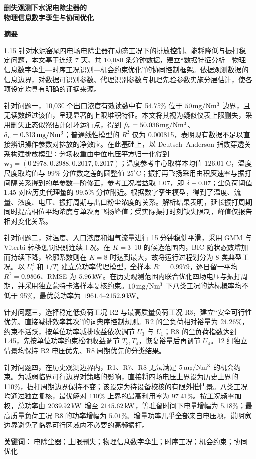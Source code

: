 \thispagestyle{plain}
\begin{center}
  \vspace*{-1.2em}
  {\heiti\bfseries 删失观测下水泥电除尘器的\\[0.20em]
  物理信息数字孪生与协同优化\par}
  \vspace{0.9em}
  {\heiti\bfseries 摘\quad 要}
\end{center}

\begin{spacing}{1.15}
针对水泥窑尾四电场电除尘器在动态工况下的排放控制、能耗降低与振打稳定问题，本文基于连续 7 天、共 10,080 条分钟数据，建立“数据特征分析—物理信息数字孪生—时序工况识别—机会约束优化”的协同控制框架。依据观测数据的信息边界，对数据可识别参数、代理识别参数与机理先验参数实施分层估计，使各项设定均具有明确的证据来源。

针对问题一，10,030 个出口浓度有效读数中有 54.75\% 位于 $50\,\mathrm{mg/Nm^3}$ 边界，且无读数超过该值，呈现显著的上限堆积特征。本文将其视为疑似仪表上限删失，采用删失正态似然估计闭环运行点，得到 $\hat\mu_c=50.036\,\mathrm{mg/Nm^3}$、$\hat\sigma_c=0.313\,\mathrm{mg/Nm^3}$；普通线性模型的 $R^2$ 仅为 0.000815，表明现有数据不足以直接辨识操作参数对排放的净效应。在此基础上，以 Deutsch--Anderson 指数穿透关系构建排放模型：分场权重由中位电压平方归一化得到 $\bm w_0=(0.2978,0.2988,0.2017,0.2017)$；温度参考中心取样本均值 $126.01^\circ\mathrm C$，温度尺度取均值与 99\% 分位数之差的圆整值 $25^\circ\mathrm C$；振打再飞扬采用由积灰速率与振打间隔关系得到的单参数一阶修正，参考工况增益取 1.07，即 $\delta=0.07$；尘负荷阈值 1.45 对应历史代理量的 99.5\% 分位附近。根据数字孪生模型，得到了温度、流量、浓度、电压、振打周期与出口粉尘浓度的关系。解析结果表明，延长振打周期同时提高相位平均浓度与单次再飞扬峰值；受实际振打时刻缺失限制，峰值仅报告相对变化关系。

针对问题二，对温度、入口浓度和烟气流量进行 15 分钟稳健平滑，采用 GMM 与 Viterbi 转移惩罚识别连续工况。在 $K=3$--10 的候选范围内，BIC 随状态数增加而持续下降，轮廓系数则在 $K=8$ 时达到最大，故将运行过程划分为 8 类典型工况。以 $U_i^2$ 和 $1/T_i$ 建立总功率代理模型，全样本 $R^2=0.9979$，逐日留一平均 $R^2=0.9866$、RMSE 为 $5.96\,\mathrm{kW}$。在历史观测范围内联合优化四场电压与振打周期，并采用独立蒙特卡洛样本复核约束。$10\,\mathrm{mg/Nm^3}$ 下八类工况的达标概率均不低于 95\%，最优总功率为 $1961.4$--$2152.9\,\mathrm{kW}$。

针对问题三，选择稳定低负荷工况 R2 与最高质量负荷工况 R8，建立“安全可行性优先、直接减排效率其次”的词典序控制规则。R2 的尘负荷相对裕量为 24.26\%，约束不活跃，按单位功率减排收益依次调节 $U_3$ 与 $U_1$；R8 的尘负荷指数达到 1.45，先按单位功率约束松弛收益调节 $T_3,T_4$，恢复裕量后再调节 $U_4$。12 组独立情景均保持 R2 电压优先、R8 周期优先的分类结果。

针对问题四，在历史观测边界内，R1、R7、R8 无法满足 $5\,\mathrm{mg/Nm^3}$ 的机会约束。为减弱临界可行边界对策略的影响，直接将四场电压上界设为历史上界的 110\%，振打周期边界保持不变；该设定为待设备校核的有限外推情景。八类工况均通过独立复核，最优解对 110\% 上界的最高利用率为 97.41\%。按工况频率加权，总功率由 $2039.92\,\mathrm{kW}$ 增至 $2145.62\,\mathrm{kW}$，等驻留时间下电量增幅为 $5.18\%$；最高质量负荷工况 R8 的功率增幅为 $5.01\%$。增量功率几乎全部来自电压项，说明宽边界避免了临界可行区域内不必要的高频振打。
\end{spacing}

\noindent\textbf{关键词：} 电除尘器；上限删失；物理信息数字孪生；时序工况；机会约束；协同优化
